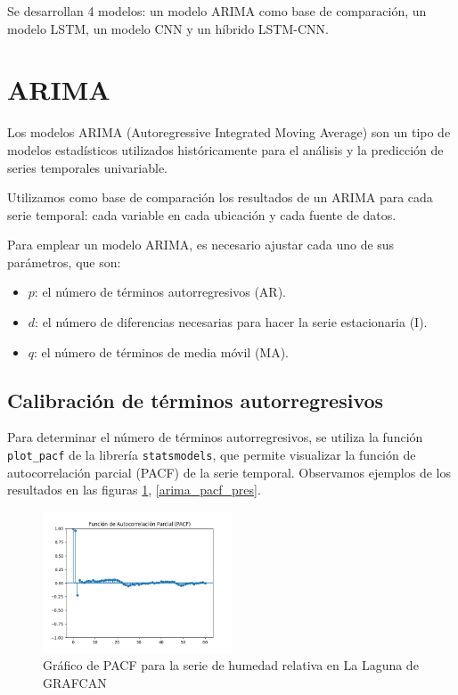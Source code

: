 Se desarrollan 4 modelos: un modelo ARIMA como base de comparación, un modelo LSTM, un modelo CNN y un híbrido LSTM-CNN.

\section{ARIMA}
Los modelos ARIMA (Autoregressive Integrated Moving Average) son un tipo de modelos estadísticos utilizados históricamente para el análisis y la predicción de series temporales
univariable. 

Utilizamos como base de comparación los resultados de un ARIMA para cada serie temporal: cada variable en cada ubicación y cada fuente de datos.

Para emplear un modelo ARIMA, es necesario ajustar cada uno de sus parámetros, que son:
\begin{itemize}
    \item $p$: el número de términos autorregresivos (AR).
    \item $d$: el número de diferencias necesarias para hacer la serie estacionaria (I).
    \item $q$: el número de términos de media móvil (MA).
\end{itemize}

\subsection{Calibración de términos autorregresivos}
Para determinar el número de términos autorregresivos, se utiliza la función \texttt{plot\_pacf} de la librería \texttt{statsmodels}, 
que permite visualizar la función de autocorrelación parcial (PACF) de la serie temporal. Observamos ejemplos de los resultados en las figuras \ref{arima_pacf_hum}, \ref{arima_pacf_pres}. 

\begin{figure}[H]
    \centering
    \includegraphics[width=0.5\textwidth]{images/arima_pacf_hum.png}
    \caption{Gráfico de PACF para la serie de humedad relativa en La Laguna de GRAFCAN}
    \label{arima_pacf_hum}
\end{figure}

